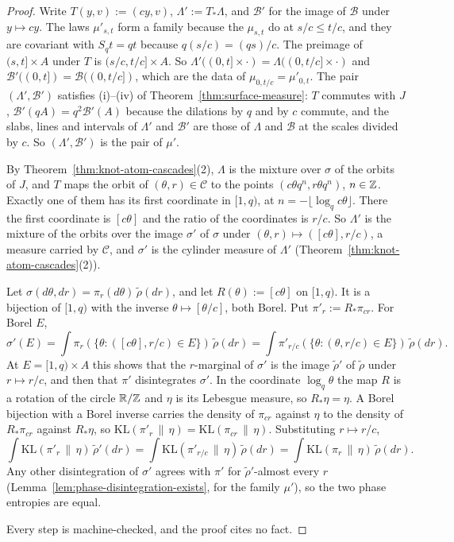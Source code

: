 \begin{proof}
\leanok
{}
Write $T(y, v) := (cy, v)$, $\Lambda' := T_*\Lambda$, and $\mathcal{B}'$ for the image of
$\mathcal{B}$ under $y \mapsto cy$. The laws $\mu'_{s,t}$ form a family because the $\mu_{s,t}$ do
at $s/c \le t/c$, and they are covariant with $S_qt = qt$ because $q(s/c) = (qs)/c$. The preimage
of $(s,t] \times A$ under $T$ is $(s/c, t/c] \times A$. So
$\Lambda'((0,t] \times \cdot) = \Lambda((0,t/c] \times \cdot)$ and
$\mathcal{B}'((0,t]) = \mathcal{B}((0,t/c])$, which are the data of $\mu_{0,t/c} = \mu'_{0,t}$.
The pair $(\Lambda', \mathcal{B}')$ satisfies (i)--(iv) of Theorem~\ref{thm:surface-measure}:
$T$ commutes with $J$, $\mathcal{B}'(qA) = q^2\mathcal{B}'(A)$ because the dilations by $q$ and
by $c$ commute, and
the slabs, lines and intervals of $\Lambda'$ and $\mathcal{B}'$ are those of $\Lambda$ and
$\mathcal{B}$ at the scales divided by $c$. So $(\Lambda', \mathcal{B}')$ is the pair of $\mu'$.

By Theorem~\ref{thm:knot-atom-cascades}(2), $\Lambda$ is the mixture over $\sigma$ of the orbits
of $J$, and $T$ maps the orbit of $(\theta, r) \in \mathcal{C}$ to the points
$(c\theta q^n, r\theta q^n)$, $n \in \mathbb{Z}$. Exactly one of them has its first coordinate in
$[1,q)$, at $n = -\lfloor\log_q c\theta\rfloor$. There the first coordinate is $[c\theta]$ and the
ratio of the coordinates is $r/c$. So $\Lambda'$ is the mixture of the orbits over the image
$\sigma'$ of $\sigma$ under $(\theta, r) \mapsto ([c\theta], r/c)$, a measure carried by
$\mathcal{C}$, and $\sigma'$ is the cylinder measure of $\Lambda'$
(Theorem~\ref{thm:knot-atom-cascades}(2)).

Let $\sigma(d\theta, dr) = \pi_r(d\theta)\,\tilde\rho(dr)$, and let $R(\theta) := [c\theta]$ on
$[1,q)$. It is a bijection of $[1,q)$ with the inverse $\theta \mapsto [\theta/c]$, both Borel.
Put $\pi'_r := R_*\pi_{cr}$. For Borel $E$,
\[
  \sigma'(E) = \int\pi_r(\{\theta : ([c\theta], r/c) \in E\})\,\tilde\rho(dr)
  = \int\pi'_{r/c}(\{\theta : (\theta, r/c) \in E\})\,\tilde\rho(dr).
\]
At $E = [1,q) \times A$ this shows that the $r$-marginal of $\sigma'$ is the image $\tilde\rho'$
of $\tilde\rho$ under $r \mapsto r/c$, and then that $\pi'$ disintegrates $\sigma'$. In the
coordinate $\log_q\theta$ the map $R$ is a rotation of the circle $\mathbb{R}/\mathbb{Z}$ and $\eta$ is its
Lebesgue measure, so $R_*\eta = \eta$. A Borel bijection with a Borel inverse carries the density
of $\pi_{cr}$ against $\eta$ to the density of $R_*\pi_{cr}$ against $R_*\eta$, so
$\mathrm{KL}(\pi'_r \,\|\, \eta) = \mathrm{KL}(\pi_{cr} \,\|\, \eta)$. Substituting $r \mapsto r/c$,
\[
  \int\mathrm{KL}(\pi'_r \,\|\, \eta)\,\tilde\rho'(dr)
  = \int\mathrm{KL}(\pi'_{r/c} \,\|\, \eta)\,\tilde\rho(dr)
  = \int\mathrm{KL}(\pi_r \,\|\, \eta)\,\tilde\rho(dr).
\]
Any other disintegration of $\sigma'$ agrees with $\pi'$ for $\tilde\rho'$-almost every $r$
(Lemma~\ref{lem:phase-disintegration-exists}, for the family $\mu'$), so the two phase entropies
are equal.

Every step is machine-checked, and the proof cites no fact.
\end{proof}

